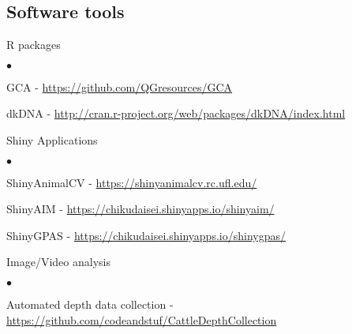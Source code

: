 \documentclass[margin,line,10pt]{res}
\newenvironment{list1}{
  \begin{list}{\ding{113}}{%
      \setlength{\itemsep}{0in}
      \setlength{\parsep}{0in} \setlength{\parskip}{0in}
      \setlength{\topsep}{0in} \setlength{\partopsep}{0in} 
      \setlength{\leftmargin}{0.17in}}}{\end{list}}
\newenvironment{list2}{
  \begin{list}{$\bullet$}{%
      \setlength{\itemsep}{0in}
      \setlength{\parsep}{0in} \setlength{\parskip}{0in}
      \setlength{\topsep}{0in} \setlength{\partopsep}{0in} 
      \setlength{\leftmargin}{0.2in}}}{\end{list}}
\begin{document}
\begin{resume}
\vspace{0.5cm}
\section{\sc Software tools} 
\begin{list1}
\item[] R packages
\begin{list2}
  \item GCA - \textcolor{blue}{\href{https://github.com/QGresources/GCA}{https://github.com/QGresources/GCA}}

  \vspace{0.3cm}

\item dkDNA - \textcolor{blue}{\href{http://cran.r-project.org/web/packages/dkDNA/index.html}{http://cran.r-project.org/web/packages/dkDNA/index.html}}
\end{list2}


\vspace{0.3cm}
\item[] Shiny Applications
  \begin{list2}
    \item ShinyAnimalCV - \textcolor{blue}{\href{https://shinyanimalcv.rc.ufl.edu/}{https://shinyanimalcv.rc.ufl.edu/}}

    \vspace{0.3cm}

    \item ShinyAIM - \textcolor{blue}{\href{https://chikudaisei.shinyapps.io/shinyaim/}{https://chikudaisei.shinyapps.io/shinyaim/}}

    \vspace{0.3cm}
    
\item ShinyGPAS - \textcolor{blue}{\href{https://chikudaisei.shinyapps.io/shinygpas/}{https://chikudaisei.shinyapps.io/shinygpas/}} 
\end{list2}



\vspace{0.3cm}
\item[] Image/Video analysis
  \begin{list2}
  \item Automated depth data collection - \textcolor{blue}{\href{https://github.com/codeandstuf/CattleDepthCollection}{https://github.com/codeandstuf/CattleDepthCollection}}
\end{list2}



\end{list1}
\end{resume}
\end{document}
